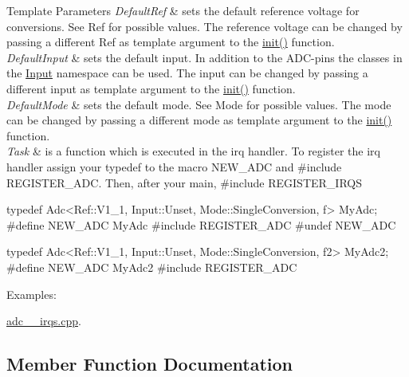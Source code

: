 \begin{DoxyTemplParams}{Template Parameters}
{\em Default\+Ref} & sets the default reference voltage for conversions. See Ref for possible values. The reference voltage can be changed by passing a different Ref as template argument to the \hyperlink{classadc_1_1Adc_ae453bb940554c62082776bd41a9053a3}{init()} function. \\
\hline
{\em Default\+Input} & sets the default input. In addition to the A\+D\+C-\/pins the classes in the \hyperlink{namespaceadc_1_1Input}{Input} namespace can be used. The input can be changed by passing a different input as template argument to the \hyperlink{classadc_1_1Adc_ae453bb940554c62082776bd41a9053a3}{init()} function. \\
\hline
{\em Default\+Mode} & sets the default mode. See Mode for possible values. The mode can be changed by passing a different mode as template argument to the \hyperlink{classadc_1_1Adc_ae453bb940554c62082776bd41a9053a3}{init()} function. \\
\hline
{\em Task} & is a function which is executed in the irq handler. To register the irq handler assign your typedef to the macro {\ttfamily N\+E\+W\+\_\+\+A\+DC} and {\ttfamily \#include R\+E\+G\+I\+S\+T\+E\+R\+\_\+\+A\+DC}. Then, after your main, {\ttfamily \#include R\+E\+G\+I\+S\+T\+E\+R\+\_\+\+I\+R\+QS}\\
\hline
\end{DoxyTemplParams}
\begin{DoxyVerb}typedef Adc<Ref::V1_1, Input::Unset, Mode::SingleConversion, f> MyAdc;
#define NEW_ADC MyAdc
#include REGISTER_ADC
#undef NEW_ADC

typedef Adc<Ref::V1_1, Input::Unset, Mode::SingleConversion, f2> MyAdc2;
#define NEW_ADC MyAdc2
#include REGISTER_ADC\end{DoxyVerb}
 \begin{Desc}
\item[Examples\+: ]\par
\hyperlink{adc_2_irqs_8cpp-example}{adc\+\_\+\_\+irqs.\+cpp}.\end{Desc}


\subsection{Member Function Documentation}
